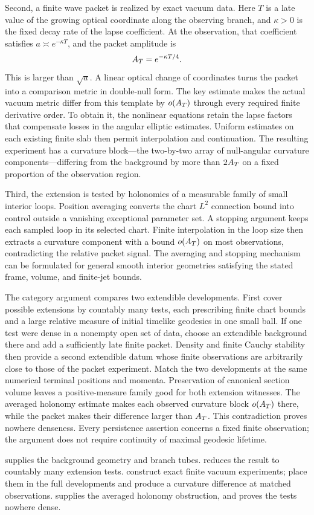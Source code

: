 Second, a finite wave packet is realized by exact vacuum data. Here
$T$ is a late value of the growing optical coordinate along the
observing branch, and $\kappa>0$ is the fixed decay rate of the lapse
coefficient. At the observation, that coefficient satisfies
$a\asymp e^{-\kappa T}$, and the packet amplitude is
\[
 A_T=e^{-\kappa T/4}.
\]
This is larger than $\sqrt a$. A linear optical change of coordinates
turns the packet into a comparison metric in double-null form. The
key estimate makes the actual vacuum metric differ from this template
by $o(A_T)$ through every required finite derivative order. To obtain
it, the nonlinear equations retain the lapse factors that compensate
losses in the angular elliptic estimates. Uniform estimates on each
existing finite slab then permit interpolation and continuation.
The resulting experiment has a curvature block---the two-by-two array
of null-angular curvature components---differing from the background by more than $2A_T$ on a fixed proportion of the
observation region.

Third, the extension is tested by holonomies of a measurable
family of small interior loops. Position averaging converts the
chart $L^2$ connection bound into control outside a vanishing
exceptional parameter set. A stopping argument keeps each
sampled loop in its selected chart. Finite interpolation in the
loop size then extracts a curvature component with a bound
$o(A_T)$ on most observations, contradicting the relative packet
signal. The averaging and stopping mechanism can be formulated
for general smooth interior geometries satisfying the stated
frame, volume, and finite-jet bounds.

The category argument compares two extendible developments. First
cover possible extensions by countably many tests, each prescribing
finite chart bounds and a large relative measure of initial timelike
geodesics in one small ball. If one test were dense in a nonempty open
set of data, choose an extendible background there and add a sufficiently
late finite packet. Density and finite Cauchy stability then provide a
second extendible datum whose finite observations are arbitrarily close
to those of the packet experiment. Match the two developments at the
same numerical terminal positions and momenta. Preservation of canonical
section volume leaves a positive-measure family good for both extension
witnesses. The averaged holonomy estimate makes each observed curvature
block $o(A_T)$ there, while the packet makes their difference larger
than $A_T$. This contradiction proves nowhere denseness. Every
persistence assertion concerns a fixed finite observation; the argument
does not require continuity of maximal geodesic lifetime.

 supplies the background geometry and branch tubes.
 reduces the result to countably many extension
tests.  construct exact
finite vacuum experiments; 
place them in the full developments and produce a curvature difference
at matched observations.  supplies the averaged
holonomy obstruction, and  proves the tests
nowhere dense.
